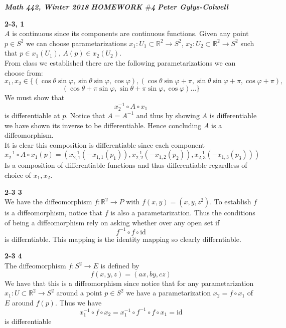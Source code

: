 \documentclass[12pt]{article}
\newenvironment{ques}[1]{\textbf{#1}\vspace{1 mm}\\ }{\bigskip}
\theoremstyle{definition}
\renewcommand{\l}{\left }
\renewcommand{\r}{\right }
\newcommand{\R}{\mathbb R}
\renewcommand{\t}{\theta}
\begin{document}
\noindent \textit{\textbf{Math 442, Winter 2018}} \hspace{1.3cm}
\textit{\textbf{HOMEWORK $\#$4}} \hspace{1.3cm} \textit{\textbf{Peter
Gylys-Colwell}} 

\vspace{1cm}

\begin{ques}{2-3, 1}
	$A$ is continuous since its components are continuous functions. Given any
	point $p \in S^2$ we can choose parametarizations $x_1: U_1 \subset \R^2
	\to S^2$, $x_2: U_2 \subset \R^2 \to S^2$ such that $p \in x_1(U_1)$, $A(p)
	\in x_2(U_2)$.\\
	From class we established there are the following parametarizations we can
	choose from:
	$$x_1,x_2 \in \{(\cos \theta \sin \varphi, \sin \t \sin \varphi, \cos
	\varphi), (\cos \theta \sin \varphi + \pi, \sin \t \sin \varphi + \pi, \cos
	\varphi + \pi),$$
	$$(\cos \theta + \pi \sin \varphi, \sin \t + \pi \sin \varphi, \cos
	\varphi) \dots\}$$
	We must show that 
	$$x_2^{-1} \circ A \circ x_1$$
	is differentiable at $p$. Notice that $A = A^{-1}$ and thus by showing $A$
	is differentiable we have shown its inverse to be differentiable. Hence
	concluding $A$ is a diffeomorphism.\\
	It is clear this composition is differentiable since each component
	$$x_2^{-1} \circ A \circ x_1(p) = (x_{2,1}^{-1}(-x_{1,1}(p_1)),
	x_{2,2}^{-1}(-x_{1,2}(p_2)), x_{2,3}^{-1}(-x_{1,3}(p_3)))$$
	Is a composition of differentiable functions and thus differentiable
	regardless of choice of $x_1, x_2$.
\end{ques}

\begin{ques}{2-3 3}
	We have the diffeomorphism $f: \R^2 \to P$ with $f(x,y) = (x,y,z^2)$. To
	establish $f$ is a diffeomorphism, notice that $f$ is also a
	parametarization. Thus the conditions of being a diffeomorphism rely on
	asking whether over any open set if
	$$f^{-1} \circ f \circ \text{id}$$
	is differntiable. This mapping is the identity mapping so clearly differntiable.
\end{ques}

\begin{ques}{2-3 4}
	The diffeomorphism $f:S^2 \to E$ is defined by 
	$$f(x,y,z) = \l(a x, b y, c z\r)$$
	We have that this is a diffeomorphism since notice that for any
	parametarization $x_1: U \subset \R^2 \to S^2$ around a point $p \in S^2$
	we have a parametarization $x_2 = f \circ x_1$ of $E$ around $f(p)$. Thus we have
	$$x_1^{-1} \circ f \circ x_2 = x_1^{-1} \circ f^{-1} \circ f \circ x_1 =
	\text{id}$$
	is differentiable
\end{ques}
\end{document}
